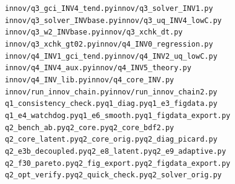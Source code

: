 \noindent \texttt{innov/\allowbreak{}q3\_\allowbreak{}gci\_\allowbreak{}INV4\_\allowbreak{}tend.py}\quad \texttt{innov/\allowbreak{}q3\_\allowbreak{}solver\_\allowbreak{}INV1.py}
\noindent \texttt{innov/\allowbreak{}q3\_\allowbreak{}solver\_\allowbreak{}INVbase.py}\quad \texttt{innov/\allowbreak{}q3\_\allowbreak{}uq\_\allowbreak{}INV4\_\allowbreak{}lowC.py}
\noindent \texttt{innov/\allowbreak{}q3\_\allowbreak{}w2\_\allowbreak{}INVbase.py}\quad \texttt{innov/\allowbreak{}q3\_\allowbreak{}xchk\_\allowbreak{}dt.py}
\noindent \texttt{innov/\allowbreak{}q3\_\allowbreak{}xchk\_\allowbreak{}gt02.py}\quad \texttt{innov/\allowbreak{}q4\_\allowbreak{}INV0\_\allowbreak{}regression.py}
\noindent \texttt{innov/\allowbreak{}q4\_\allowbreak{}INV1\_\allowbreak{}gci\_\allowbreak{}tend.py}\quad \texttt{innov/\allowbreak{}q4\_\allowbreak{}INV2\_\allowbreak{}uq\_\allowbreak{}lowC.py}
\noindent \texttt{innov/\allowbreak{}q4\_\allowbreak{}INV4\_\allowbreak{}aux.py}\quad \texttt{innov/\allowbreak{}q4\_\allowbreak{}INV5\_\allowbreak{}theory.py}
\noindent \texttt{innov/\allowbreak{}q4\_\allowbreak{}INV\_\allowbreak{}lib.py}\quad \texttt{innov/\allowbreak{}q4\_\allowbreak{}core\_\allowbreak{}INV.py}
\noindent \texttt{innov/\allowbreak{}run\_\allowbreak{}innov\_\allowbreak{}chain.py}\quad \texttt{innov/\allowbreak{}run\_\allowbreak{}innov\_\allowbreak{}chain2.py}
\noindent \texttt{q1\_\allowbreak{}consistency\_\allowbreak{}check.py}\quad \texttt{q1\_\allowbreak{}diag.py}\quad \texttt{q1\_\allowbreak{}e3\_\allowbreak{}figdata.py}
\noindent \texttt{q1\_\allowbreak{}e4\_\allowbreak{}watchdog.py}\quad \texttt{q1\_\allowbreak{}e6\_\allowbreak{}smooth.py}\quad \texttt{q1\_\allowbreak{}figdata\_\allowbreak{}export.py}
\noindent \texttt{q2\_\allowbreak{}bench\_\allowbreak{}ab.py}\quad \texttt{q2\_\allowbreak{}core.py}\quad \texttt{q2\_\allowbreak{}core\_\allowbreak{}bdf2.py}
\noindent \texttt{q2\_\allowbreak{}core\_\allowbreak{}latent.py}\quad \texttt{q2\_\allowbreak{}core\_\allowbreak{}orig.py}\quad \texttt{q2\_\allowbreak{}diag\_\allowbreak{}picard.py}
\noindent \texttt{q2\_\allowbreak{}e3b\_\allowbreak{}decoupled.py}\quad \texttt{q2\_\allowbreak{}e8\_\allowbreak{}latent.py}\quad \texttt{q2\_\allowbreak{}e9\_\allowbreak{}adaptive.py}
\noindent \texttt{q2\_\allowbreak{}f30\_\allowbreak{}pareto.py}\quad \texttt{q2\_\allowbreak{}fig\_\allowbreak{}export.py}\quad \texttt{q2\_\allowbreak{}figdata\_\allowbreak{}export.py}
\noindent \texttt{q2\_\allowbreak{}opt\_\allowbreak{}verify.py}\quad \texttt{q2\_\allowbreak{}quick\_\allowbreak{}check.py}\quad \texttt{q2\_\allowbreak{}solver\_\allowbreak{}orig.py}
